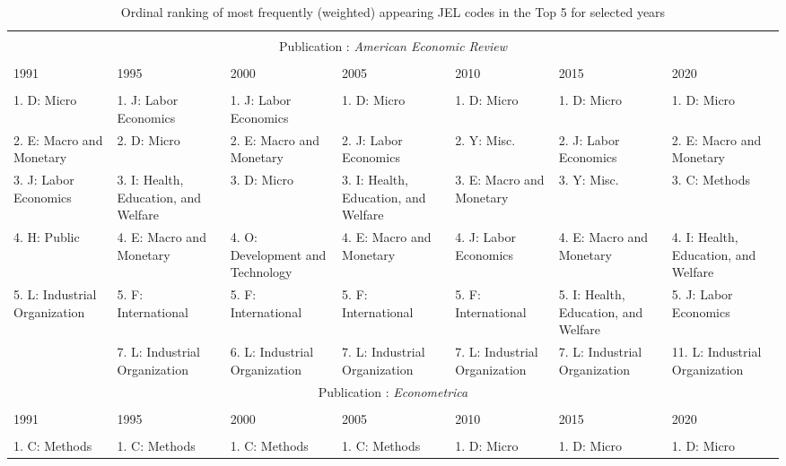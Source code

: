 
\begin{table}[h] \centering 
  \caption{Ordinal ranking of most frequently (weighted) appearing JEL codes in the Top 5 for selected years} 
  \label{} 
\begin{adjustbox}{max width = \textwidth}
\scriptsize 
\begin{tabular}{@{\extracolsep{5pt}} lllllll} 
\\[-1.8ex]\hline 
\hline \\[-1.8ex] \multicolumn{7}{c}{Publication : \textit{American Economic Review}} \\
 \cline{1-7} \\
1991 & 1995 & 2000 & 2005 & 2010 & 2015 & 2020 \\ 
\hline \\[-1.8ex] 
1. D: Micro & 1. J: Labor Economics & 1. J: Labor Economics & 1. D: Micro & 1. D: Micro & 1. D: Micro & 1. D: Micro \\ 
2. E: Macro and Monetary & 2. D: Micro & 2. E: Macro and Monetary & 2. J: Labor Economics & 2. Y: Misc. & 2. J: Labor Economics & 2. E: Macro and Monetary \\ 
3. J: Labor Economics & 3. I: Health, Education, and Welfare & 3. D: Micro & 3. I: Health, Education, and Welfare & 3. E: Macro and Monetary & 3. Y: Misc. & 3. C: Methods \\ 
4. H: Public & 4. E: Macro and Monetary & 4. O: Development and Technology & 4. E: Macro and Monetary & 4. J: Labor Economics & 4. E: Macro and Monetary & 4. I: Health, Education, and Welfare \\ 
5. L: Industrial Organization & 5. F: International & 5. F: International & 5. F: International & 5. F: International & 5. I: Health, Education, and Welfare & 5. J: Labor Economics \\ 
 & 7. L: Industrial Organization & 6. L: Industrial Organization & 7. L: Industrial Organization & 7. L: Industrial Organization & 7. L: Industrial Organization & 11. L: Industrial Organization \\ 
 \multicolumn{7}{c}{Publication : \textit{Econometrica}} \\
 \cline{1-7} \\
1991 & 1995 & 2000 & 2005 & 2010 & 2015 & 2020 \\ 
\hline \\[-1.8ex] 
1. C: Methods & 1. C: Methods & 1. C: Methods & 1. C: Methods & 1. D: Micro & 1. D: Micro & 1. D: Micro \\ 

\end{tabular}
\end{adjustbox}
\end{table}
